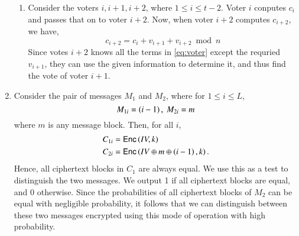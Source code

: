 \documentclass[journal,12pt,twocolumn]{IEEEtran}
\begin{document}
\begin{enumerate}
\begin{enumerate}
        \item Consider the voters \(i, i+1, i+2\), where \(1 \le i \le t - 2\).
        Voter \(i\) conputes \(c_i\) and passes that on to voter \(i+2\). Now,
        when voter \(i+2\) computes \(c_{i+2}\), we have,
            \begin{equation}
                c_{i+2} = c_i + v_{i+1} + v_{i+2} \bmod{n}
                \label{eq:voter}
            \end{equation}
        Since votes \(i+2\) knows all the terms in \eqref{eq:voter} except the
        requried \(v_{i+1}\), they can use the given information to determine
        it, and thus find the vote of voter \(i+1\).
    \end{enumerate}

    \item Consider the pair of messages \(M_1\) and \(M_2\), where for \(1 \le i
    \le L\),
        \begin{equation}
            M_{1i} = \left(i - 1\right),\ M_{2i} = m
        \end{equation}
    where \(m\) is any message block. Then, for all \(i\),
        \begin{align}
            C_{1i} &= \textsf{Enc}\left(IV, k\right) \\ 
            C_{2i} &= \textsf{Enc}\left(IV\oplus{}m\oplus\left(i-1\right), k\right).
        \end{align}
    Hence, all ciphertext blocks in \(C_1\) are always equal. We use this as a
    test to distinguish the two messages. We output 1 if all ciphertext blocks
    are equal, and 0 otherwise. Since the probabilities of all ciphertext blocks
    of \(M_2\) can be equal with negligible probability, it follows that we can
    distinguish between these two messages encrypted using this mode of
    operation with high probability.
\end{enumerate}
\end{document}
